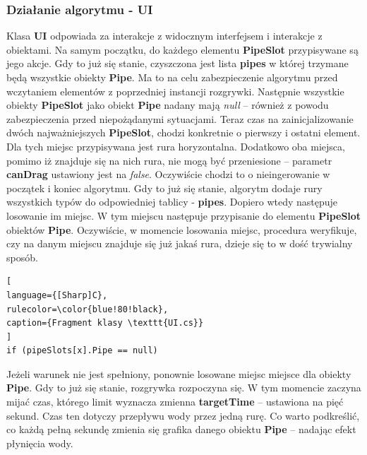 \documentclass[oneside,polski,logo]{amuthesis}
\begin{document}
\subsubsection{Działanie algorytmu - UI}
Klasa \textbf{UI} odpowiada za interakcje z widocznym interfejsem i interakcje z obiektami. Na samym początku, do każdego elementu \textbf{PipeSlot} przypisywane są jego akcje. Gdy to już się stanie, czyszczona jest lista \textbf{pipes} w której trzymane będą wszystkie obiekty \textbf{Pipe}. Ma to na celu zabezpieczenie algorytmu przed wczytaniem elementów z poprzedniej instancji rozgrywki. Następnie wszystkie obiekty \textbf{PipeSlot} jako obiekt \textbf{Pipe} nadany mają \emph{null} – również z powodu zabezpieczenia przed niepożądanymi sytuacjami. Teraz czas na zainicjalizowanie dwóch najważniejszych \textbf{PipeSlot}, chodzi konkretnie o pierwszy i ostatni element. Dla tych miejsc przypisywana jest rura horyzontalna. Dodatkowo oba miejsca, pomimo iż znajduje się na nich rura, nie mogą być przeniesione – parametr \textbf{canDrag} ustawiony jest na \emph{false}. Oczywiście chodzi to o nieingerowanie w początek i koniec algorytmu. Gdy to już się stanie, algorytm dodaje rury wszystkich typów do odpowiedniej tablicy - \textbf{pipes}. Dopiero wtedy następuje losowanie im miejsc. W tym miejscu następuje przypisanie do elementu \textbf{PipeSlot} obiektów \textbf{Pipe}. Oczywiście, w momencie losowania miejsc, procedura weryfikuje, czy na danym miejscu znajduje się już jakaś rura, dzieje się to w dość trywialny sposób.

\begin{lstlisting}[
language={[Sharp]C},
rulecolor=\color{blue!80!black},
caption={Fragment klasy \texttt{UI.cs}}
]
if (pipeSlots[x].Pipe == null)
\end{lstlisting}
Jeżeli warunek nie jest spełniony, ponownie losowane miejsc miejsce dla obiekty \textbf{Pipe}. Gdy to już się stanie, rozgrywka rozpoczyna się. W tym momencie zaczyna mijać czas, którego limit wyznacza zmienna \textbf{targetTime} – ustawiona na pięć sekund. Czas ten dotyczy przepływu wody przez jedną rurę. Co warto podkreślić, co każdą pełną sekundę zmienia się grafika danego obiektu \textbf{Pipe} – nadając efekt płynięcia wody.
\end{document}
